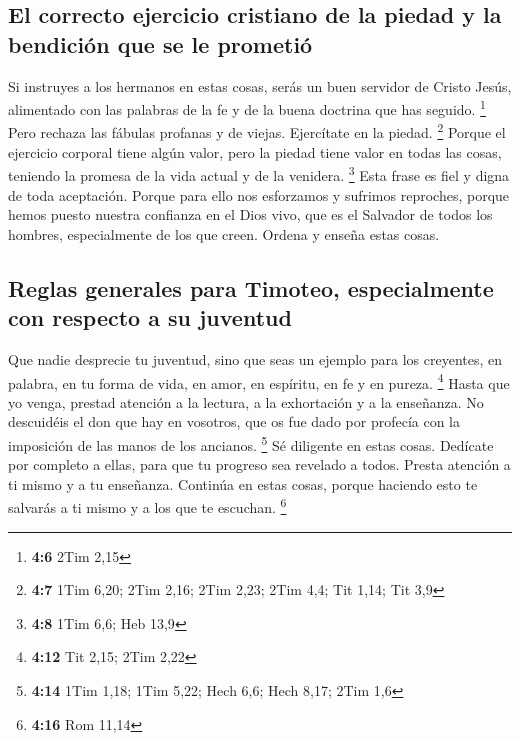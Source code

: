 \begin{paracol}{2}
\hypertarget{el-correcto-ejercicio-cristiano-de-la-piedad-y-la-bendiciuxf3n-que-se-le-prometiuxf3}{%
\subsection{El correcto ejercicio cristiano de la piedad y la bendición
que se le
prometió}\label{el-correcto-ejercicio-cristiano-de-la-piedad-y-la-bendiciuxf3n-que-se-le-prometiuxf3}}

 Si instruyes a los hermanos en estas cosas, serás un buen
servidor de Cristo Jesús, alimentado con las palabras de la fe y de la
buena doctrina que has seguido. \footnote{\textbf{4:6} 2Tim 2,15}
 Pero rechaza las fábulas profanas y de viejas. Ejercítate
en la piedad. \footnote{\textbf{4:7} 1Tim 6,20; 2Tim 2,16; 2Tim 2,23;
  2Tim 4,4; Tit 1,14; Tit 3,9}  Porque el ejercicio
corporal tiene algún valor, pero la piedad tiene valor en todas las
cosas, teniendo la promesa de la vida actual y de la venidera.
\footnote{\textbf{4:8} 1Tim 6,6; Heb 13,9}  Esta frase es
fiel y digna de toda aceptación.  Porque para ello nos
esforzamos y sufrimos reproches, porque hemos puesto nuestra confianza
en el Dios vivo, que es el Salvador de todos los hombres, especialmente
de los que creen.  Ordena y enseña estas cosas.

\hypertarget{reglas-generales-para-timoteo-especialmente-con-respecto-a-su-juventud}{%
\subsection{Reglas generales para Timoteo, especialmente con respecto a
su
juventud}\label{reglas-generales-para-timoteo-especialmente-con-respecto-a-su-juventud}}

 Que nadie desprecie tu juventud, sino que seas un
ejemplo para los creyentes, en palabra, en tu forma de vida, en amor, en
espíritu, en fe y en pureza. \footnote{\textbf{4:12} Tit 2,15; 2Tim 2,22}
 Hasta que yo venga, prestad atención a la lectura, a la
exhortación y a la enseñanza.  No descuidéis el don que
hay en vosotros, que os fue dado por profecía con la imposición de las
manos de los ancianos. \footnote{\textbf{4:14} 1Tim 1,18; 1Tim 5,22;
  Hech 6,6; Hech 8,17; 2Tim 1,6}  Sé diligente en estas
cosas. Dedícate por completo a ellas, para que tu progreso sea revelado
a todos.  Presta atención a ti mismo y a tu enseñanza.
Continúa en estas cosas, porque haciendo esto te salvarás a ti mismo y a
los que te escuchan. \footnote{\textbf{4:16} Rom 11,14}


\end{paracol}
